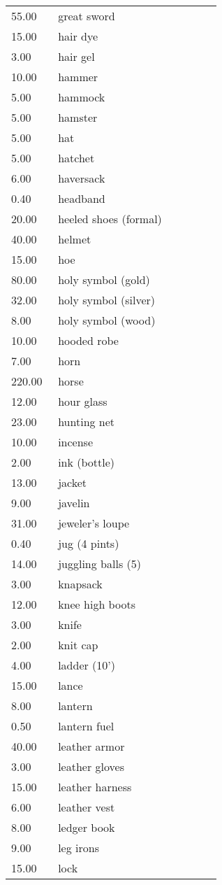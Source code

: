 \begin{tcolorbox}[breakable,boxrule=0pt,title=\textbf{Equipment Costs}]
\begin{xtabular}{@{}p{0.2\linewidth} p{0.7\linewidth}}
55.00 & great sword\\
15.00 & hair dye\\
3.00 & hair gel\\
10.00 & hammer\\
5.00 & hammock\\
5.00 & hamster\\
5.00 & hat\\
5.00 & hatchet\\
6.00 & haversack\\
0.40 & headband\\
20.00 & heeled shoes (formal)\\
40.00 & helmet\\
15.00 & hoe\\
80.00 & holy symbol (gold)\\
32.00 & holy symbol (silver)\\
8.00 & holy symbol (wood)\\
10.00 & hooded robe\\
7.00 & horn\\
220.00 & horse\\
12.00 & hour glass\\
23.00 & hunting net\\
10.00 & incense\\
2.00 & ink (bottle)\\
13.00 & jacket\\
9.00 & javelin\\
31.00 & jeweler's loupe\\
0.40 & jug (4 pints)\\
14.00 & juggling balls (5)\\
3.00 & knapsack\\
12.00 & knee high boots\\
3.00 & knife\\
2.00 & knit cap\\
4.00 & ladder (10')\\
15.00 & lance\\
8.00 & lantern\\
0.50 & lantern fuel\\
40.00 & leather armor\\
3.00 & leather gloves\\
15.00 & leather harness\\
6.00 & leather vest\\
8.00 & ledger book\\
9.00 & leg irons\\
15.00 & lock\\

\end{xtabular}
\end{tcolorbox}
